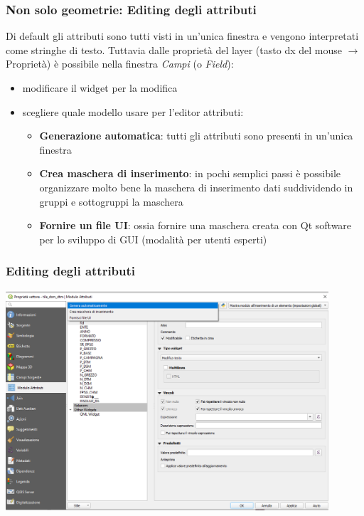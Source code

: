 \documentclass{beamer}
\begin{document}
{\begin{frame}
   \frametitle{Non solo geometrie: Editing degli attributi} 
	Di default gli attributi sono tutti visti in un'unica finestra e vengono interpretati come stringhe di testo. 
	Tuttavia dalle proprietà del layer (tasto dx del mouse $\rightarrow$ Proprietà) è possibile nella finestra \textit{Campi} (o \textit{Field}):
	\begin{itemize}
		\item modificare il widget per la modifica
		\item scegliere quale modello usare per l'editor attributi: 
		\begin{itemize}
			\item \textbf{Generazione automatica}: tutti gli attributi sono presenti in un'unica finestra
			\item \textbf{Crea maschera di inserimento}: in pochi semplici passi è possibile organizzare molto bene la maschera di inserimento dati suddividendo in gruppi e sottogruppi la maschera
			\item \textbf{Fornire un file UI}: ossia fornire una maschera creata con Qt software per lo sviluppo di GUI (modalità per utenti esperti)
		\end{itemize}

	\end{itemize}
\end{frame}


\begin{frame}
   \frametitle{Editing degli attributi} 
	\begin{center}
		\includegraphics[width=0.9\textwidth] {pics/campi_attributi-3.png}
	\end{center}
\end{frame}


}
\end{document}
